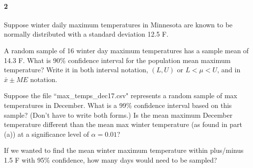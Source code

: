 \documentclass{article}
\begin{document}
\begin{flushleft}
\paragraph{2} Suppose winter daily maximum temperatures in Minnesota are known to be normally distributed with a standard deviation 12.5 \textdegree F. 
\begin{enumalpha}
\item A random sample of 16 winter day maximum temperatures has a sample mean of  14.3 \textdegree F. What is 90\% confidence interval for the population mean maximum temperature? Write it in both interval notation, $(L, U)$ or $L < \mu < U$, and in $\bar x \pm ME$ notation. 
\vspace{2.5in}
\item Suppose the file ``max\_temps\_dec17.csv" represents a random sample of max temperatures in December. What is a 99\% confidence interval based on this sample? (Don't have to write both forms.) Is the mean maximum December temperature different than the mean max winter temperature (as found in part (a)) at a significance level of $\alpha = 0.01$?
\vspace{2.5in}
\item If we wanted to find the mean winter maximum temperature within plus/minus 1.5 \textdegree F with 95\% confidence, how many days would need to be sampled?
\end{enumalpha}



\end{flushleft}
\end{document}
